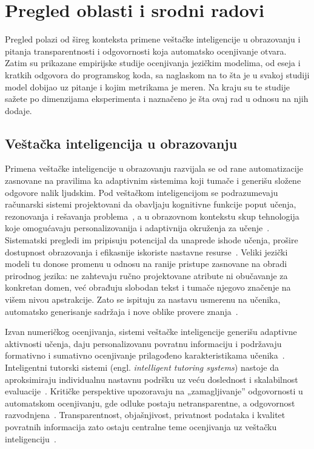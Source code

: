 \chapter{Pregled oblasti i srodni radovi}
\label{sec:pregled}

Pregled polazi od šireg konteksta primene veštačke inteligencije u obrazovanju
i pitanja transparentnosti i odgovornosti koja automatsko ocenjivanje otvara.
Zatim su prikazane empirijske studije ocenjivanja jezičkim modelima,
od eseja i kratkih odgovora do programskog koda,
sa naglaskom na to šta je u svakoj studiji model dobijao uz pitanje i kojim metrikama je meren.
Na kraju su te studije sažete po dimenzijama eksperimenta
i naznačeno je šta ovaj rad u odnosu na njih dodaje.

\section{Veštačka inteligencija u obrazovanju}
\label{sec:vi-obrazovanje}

Primena veštačke inteligencije u obrazovanju razvijala se od rane automatizacije zasnovane na pravilima
ka adaptivnim sistemima koji tumače i generišu složene odgovore nalik ljudskim.
Pod veštačkom inteligencijom se podrazumevaju računarski sistemi projektovani da obavljaju kognitivne funkcije poput učenja,
rezonovanja i rešavanja problema~\cite{baker2019educ},
a u obrazovnom kontekstu skup tehnologija koje omogućavaju personalizovanija i adaptivnija okruženja za učenje~\cite{zawacki2019systematic}.
Sistematski pregledi im pripisuju potencijal da unaprede ishode učenja,
prošire dostupnost obrazovanja i efikasnije iskoriste nastavne resurse~\cite{yuskovych2022application,zawacki2019systematic}.
Veliki jezički modeli tu donose promenu u odnosu na ranije pristupe zasnovane na obradi prirodnog jezika:
ne zahtevaju ručno projektovane atribute ni obučavanje za konkretan domen,
već obrađuju slobodan tekst i tumače njegovo značenje na višem nivou apstrakcije.
Zato se ispituju za nastavu usmerenu na učenika, automatsko generisanje sadržaja i nove oblike provere znanja~\cite{kasneci2023chatgpt}.

Izvan numeričkog ocenjivanja, sistemi veštačke inteligencije generišu adaptivne aktivnosti učenja,
daju personalizovanu povratnu informaciju
i podržavaju formativno i sumativno ocenjivanje prilagođeno karakteristikama učenika~\cite{diwan2023ai,luckin2016intelligence}.
Inteligentni tutorski sistemi (engl. \emph{intelligent tutoring systems}) nastoje da aproksimiraju individualnu nastavnu podršku
uz veću doslednost i skalabilnost evaluacije~\cite{conati2009intelligent}.
Kritičke perspektive upozoravaju na „zamagljivanje'' odgovornosti u automatskom ocenjivanju,
gde odluke postaju netransparentne, a odgovornost razvodnjena~\cite{swiecki2022assessment}.
Transparentnost, objašnjivost,
privatnost podataka i kvalitet povratnih informacija
zato ostaju centralne teme ocenjivanja uz veštačku inteligenciju~\cite{kumar2023faculty}.

